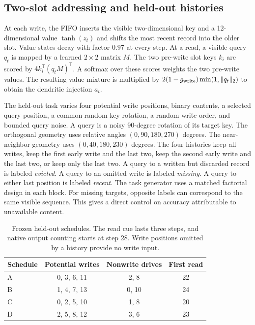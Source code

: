 \documentclass[10pt]{article}
\begin{document}
\subsection{Two-slot addressing and held-out histories}
At each write, the FIFO inserts the visible two-dimensional key and a 12-dimensional value $\tanh(z_t)$ and shifts the most recent record into the older slot. Value states decay with factor $0.97$ at every step. At a read, a visible query $q_t$ is mapped by a learned $2\times2$ matrix $M$. The two pre-write slot keys $k_i$ are scored by $4k_i^{\mathsf T}(q_tM)^{\mathsf T}$. A softmax over these scores weights the two pre-write values. The resulting value mixture is multiplied by $2(1-g_{\rm write})\min(1,\|q_t\|_2)$ to obtain the dendritic injection $a_t$.

The held-out task varies four potential write positions, binary contents, a selected query position, a common random key rotation, a random write order, and bounded query noise. A query is a noisy 90-degree rotation of its target key. The orthogonal geometry uses relative angles $(0,90,180,270)$ degrees. The near-neighbor geometry uses $(0,40,180,230)$ degrees. The four histories keep all writes, keep the first early write and the last two, keep the second early write and the last two, or keep only the last two. A query to a written but discarded record is labeled \emph{evicted}. A query to an omitted write is labeled \emph{missing}. A query to either last position is labeled \emph{recent}. The task generator uses a matched factorial design in each block. For missing targets, opposite labels can correspond to the same visible sequence. This gives a direct control on accuracy attributable to unavailable content.

\begin{table}[htbp]
\centering
\caption{Frozen held-out schedules. The read cue lasts three steps, and native output counting starts at step 28. Write positions omitted by a history provide no write input.}
\label{tab:schedules}
\begin{tabular}{lccc}
\toprule
Schedule & Potential writes & Nonwrite drives & First read \\
\midrule
A & 0, 3, 6, 11 & 2, 8 & 22 \\
B & 1, 4, 7, 13 & 0, 10 & 24 \\
C & 0, 2, 5, 10 & 1, 8 & 20 \\
D & 2, 5, 8, 12 & 3, 6 & 23 \\
\bottomrule
\end{tabular}
\end{table}
\end{document}
